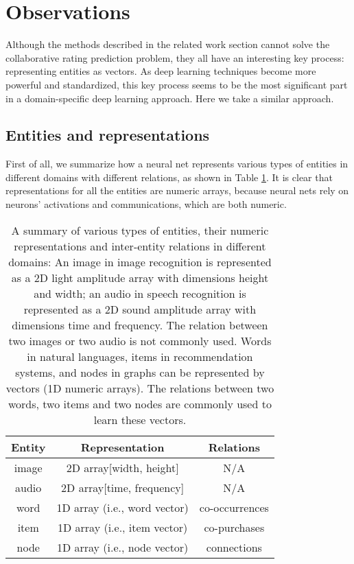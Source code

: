 \documentclass[sigconf]{acmart}
\begin{document}
\section{Observations}
Although the methods described in the related work section cannot solve the 
collaborative rating prediction problem,
they all have an interesting key process: representing entities as vectors.
As deep learning techniques become more powerful and standardized, this key 
process seems to be the most significant part in a domain-specific deep 
learning approach.
Here we take a similar approach.

\subsection{Entities and representations}
First of all, we summarize how a neural net represents various types of 
entities in different domains with different relations, as shown in 
Table \ref{tab:domains}.
It is clear that representations for all the entities are numeric arrays, 
because neural nets rely on neurons' activations and communications, which 
are both numeric.
\begin{table}[!htb]
	\centering
	\caption{A summary of various types of entities, their numeric
		representations and inter-entity relations in different domains:
		An image in image recognition is represented as a 2D light amplitude 
		array with dimensions height and width; an audio in speech recognition 
		is represented as a 2D sound amplitude array with dimensions time and 
		frequency.
		The relation between two images or two audio is not commonly used. 
		Words in natural languages, items in recommendation systems, and nodes 
		in graphs can be represented by vectors (1D numeric arrays).
		The	relations between two words, two items and two nodes are commonly 
		used to learn these vectors.
	}
	\begin{tabular}{ccc} \hline
		Entity & Representation               & Relations \\ \hline
		image  & 2D array[width, height]      & N/A \\ \hline
		audio  & 2D array[time, frequency]    & N/A \\ \hline
		word   & 1D array (i.e., word vector) & co-occurrences \\ \hline
		item   & 1D array (i.e., item vector) & co-purchases \\ \hline
		node   & 1D array (i.e., node vector) & connections \\ \hline
	\end{tabular}
	\label{tab:domains}
\end{table}
\end{document}
